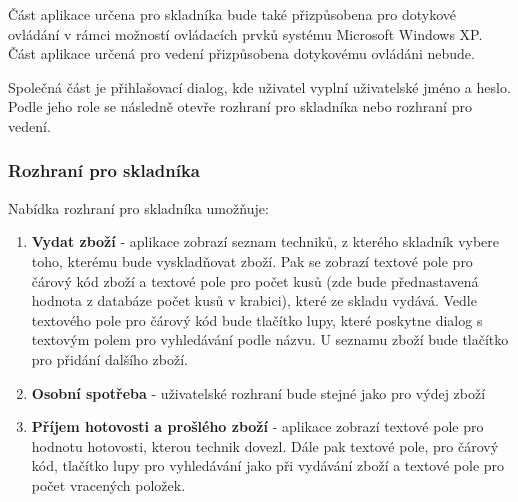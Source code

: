 \documentclass[a4paper,10pt]{article}
\begin{document}
Část aplikace určena pro skladníka bude také přizpůsobena pro dotykové ovládání v rámci možností ovládacích prvků systému Microsoft Windows XP. Část aplikace určená pro vedení přizpůsobena dotykovému ovládáni nebude.

Společná část je přihlašovací dialog, kde uživatel vyplní uživatelské jméno a heslo. Podle jeho role se následně otevře rozhraní pro skladníka nebo rozhraní pro vedení.

\subsubsection{Rozhraní pro skladníka}
Nabídka rozhraní pro skladníka umožňuje:
\begin{enumerate}
	\item \textbf{Vydat zboží} - aplikace zobrazí seznam techniků, z kterého skladník vybere toho, kterému bude vyskladňovat zboží. Pak se zobrazí textové pole pro čárový kód zboží a textové pole pro počet kusů (zde bude přednastavená hodnota z databáze počet kusů v krabici), které ze skladu vydává. Vedle textového pole pro čárový kód bude tlačítko lupy, které poskytne dialog s textovým polem pro vyhledávání podle názvu. U seznamu zboží bude tlačítko pro přidání dalšího zboží.
	\item \textbf{Osobní spotřeba} - uživatelské rozhraní bude stejné jako pro výdej zboží
	\item \textbf{Příjem hotovosti a prošlého zboží} - aplikace zobrazí textové pole pro hodnotu hotovosti, kterou technik dovezl. Dále pak textové pole, pro čárový kód, tlačítko lupy pro vyhledávání jako při vydávání zboží a textové pole pro počet vracených položek.
\end{enumerate}
\end{document}
